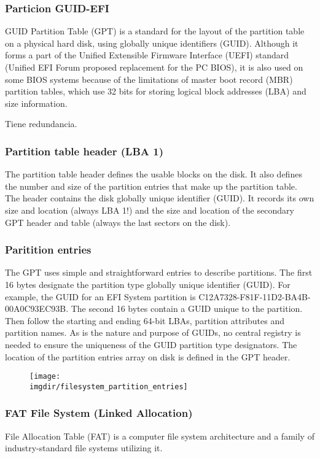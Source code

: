 \documentclass[a4paper, twoside]{article}
\newcommand{\imgdir}{../resources/images} %
\begin{document}
\subsubsection{Particion GUID-EFI}
GUID Partition Table (GPT) is a standard for the layout of the partition table on a physical hard disk, using globally unique identifiers (GUID). Although it forms a part of the Unified Extensible Firmware Interface (UEFI) standard (Unified EFI Forum proposed replacement for the PC BIOS), it is also used on some BIOS systems because of the limitations of master boot record (MBR) partition tables, which use 32 bits for storing logical block addresses (LBA) and size information.

Tiene redundancia.

\subsubsection{Partition table header (LBA 1)}
The partition table header defines the usable blocks on the disk. It also defines the number and size of the partition entries that make up the partition table. The header contains the disk globally unique identifier (GUID). It records its own size and location (always LBA 1!) and the size and location of the secondary GPT header and table (always the last sectors on the disk).

\subsubsection{Paritition entries}
The GPT uses simple and straightforward entries to describe partitions. The first 16 bytes designate the partition type globally unique identifier (GUID). For example, the GUID for an EFI System partition is C12A7328-F81F-11D2-BA4B-00A0C93EC93B. The second 16 bytes contain a GUID unique to the partition. Then follow the starting and ending 64-bit LBAs, partition attributes and partition names. As is the nature and purpose of GUIDs, no central registry is needed to ensure the uniqueness of the GUID partition type designators. The location of the partition entries array on disk is defined in the GPT header.

\begin{figure}[h]
	\centering
	\texttt{[image: \\imgdir/filesystem\_partition\_entries]}
	\label{fig:filesystem_partition_entries}
\end{figure}

\subsubsection{FAT File System (Linked Allocation)}
File Allocation Table (FAT) is a computer file system architecture and a family of industry-standard file systems utilizing it.
\end{document}
